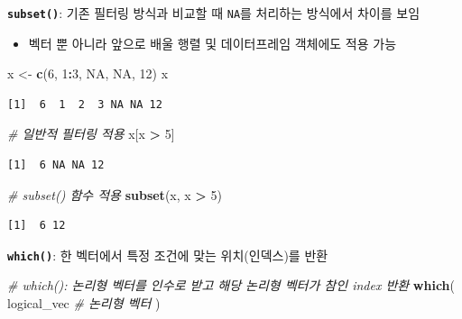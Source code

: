 \documentclass[
  11pt,
]{krantz}
\newenvironment{Shaded}{\begin{snugshade}}{\end{snugshade}}
\newcommand{\CommentTok}[1]{\textcolor[rgb]{0.37,0.37,0.37}{\textit{#1}}}
\newcommand{\DecValTok}[1]{\textcolor[rgb]{0.06,0.06,0.06}{#1}}
\newcommand{\KeywordTok}[1]{\textcolor[rgb]{0.27,0.27,0.27}{\textbf{#1}}}
\newcommand{\NormalTok}[1]{#1}
\newcommand{\OperatorTok}[1]{\textcolor[rgb]{0.43,0.43,0.43}{\textbf{#1}}}
\newcommand{\OtherTok}[1]{\textcolor[rgb]{0.37,0.37,0.37}{#1}}
\newcommand{\StringTok}[1]{\textcolor[rgb]{0.5,0.5,0.5}{#1}}
\providecommand{\tightlist}{%
  \setlength{\itemsep}{0pt}\setlength{\parskip}{0pt}}
\begin{document}
\textbf{\texttt{subset()}}: 기존 필터링 방식과 비교할 때 \texttt{NA}를 처리하는 방식에서 차이를 보임

\begin{itemize}
\tightlist
\item
  벡터 뿐 아니라 앞으로 배울 행렬 및 데이터프레임 객체에도 적용 가능
\end{itemize}

\footnotesize

\begin{Shaded}
\begin{Highlighting}[]
\NormalTok{x <-}\StringTok{ }\KeywordTok{c}\NormalTok{(}\DecValTok{6}\NormalTok{, }\DecValTok{1}\OperatorTok{:}\DecValTok{3}\NormalTok{, }\OtherTok{NA}\NormalTok{, }\OtherTok{NA}\NormalTok{, }\DecValTok{12}\NormalTok{)}
\NormalTok{x}
\end{Highlighting}
\end{Shaded}

\begin{verbatim}
[1]  6  1  2  3 NA NA 12
\end{verbatim}

\begin{Shaded}
\begin{Highlighting}[]
\CommentTok{# 일반적 필터링 적용 }
\NormalTok{x[x }\OperatorTok{>}\StringTok{ }\DecValTok{5}\NormalTok{]}
\end{Highlighting}
\end{Shaded}

\begin{verbatim}
[1]  6 NA NA 12
\end{verbatim}

\begin{Shaded}
\begin{Highlighting}[]
\CommentTok{# subset() 함수 적용}
\KeywordTok{subset}\NormalTok{(x, x }\OperatorTok{>}\StringTok{ }\DecValTok{5}\NormalTok{)}
\end{Highlighting}
\end{Shaded}

\begin{verbatim}
[1]  6 12
\end{verbatim}

\normalsize

\textbf{\texttt{which()}}: 한 벡터에서 특정 조건에 맞는 위치(인덱스)를 반환

\footnotesize

\begin{Shaded}
\begin{Highlighting}[]
\CommentTok{# which(): 논리형 벡터를 인수로 받고 해당 논리형 벡터가 참인 index 반환}
\KeywordTok{which}\NormalTok{(}
\NormalTok{  logical_vec }\CommentTok{# 논리형 벡터}
\NormalTok{)}
\end{Highlighting}
\end{Shaded}
\end{document}
